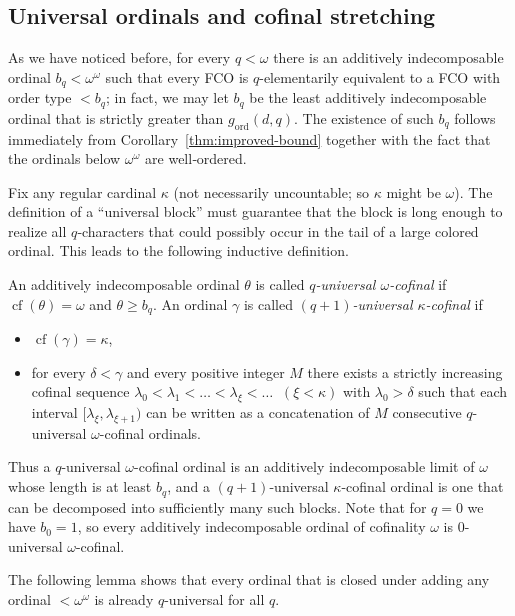 \documentclass{amsart}
\newcommand{\cf}{\operatorname{cf}}
\theoremstyle{definition}
\begin{document}
\subsection{Universal ordinals and cofinal stretching}

As we have noticed before, for every $q<\omega$ there is an additively indecomposable ordinal $b_q<\omega^\omega$ such that every FCO is $q$-elementarily equivalent to a FCO with order type $<b_q$; in fact, we may let $b_q$ be the least additively indecomposable ordinal that is strictly greater than $g_{\mathrm{ord}}(d,q)$.  The existence of such $b_q$ follows immediately from Corollary~\ref{thm:improved-bound} together with the fact that the ordinals below $\omega^\omega$ are well‑ordered.

Fix any regular cardinal $\kappa$ (not necessarily uncountable; so $\kappa$ might be $\omega$).  The definition of a ``universal block'' must guarantee that the block is long enough to realize all $q$‑characters that could possibly occur in the tail of a large colored ordinal.  This leads to the following inductive definition.

An additively indecomposable ordinal $\theta$ is called \emph{$q$-universal $\omega$-cofinal} if $\cf(\theta)=\omega$ and $\theta\geq b_q$. An ordinal $\gamma$ is called \emph{$(q+1)$-universal $\kappa$-cofinal} if
\begin{itemize}
    \item $\cf(\gamma)=\kappa$,
    \item for every $\delta<\gamma$ and every positive integer $M$ there exists a strictly increasing cofinal sequence $\lambda_0<\lambda_1<\dots<\lambda_\xi<\dots\;\;(\xi<\kappa)$ with $\lambda_0>\delta$ such that each interval $[\lambda_\xi,\lambda_{\xi+1})$ can be written as a concatenation of $M$ consecutive $q$-universal $\omega$-cofinal ordinals.
\end{itemize}

Thus a $q$-universal $\omega$-cofinal ordinal is an additively indecomposable limit of $\omega$ whose length is at least $b_q$, and a $(q+1)$-universal $\kappa$-cofinal ordinal is one that can be decomposed into sufficiently many such blocks. Note that for $q=0$ we have $b_0=1$, so every additively indecomposable ordinal of cofinality $\omega$ is $0$-universal $\omega$-cofinal.

The following lemma shows that every ordinal that is closed under adding any ordinal $<\omega^\omega$ is already $q$-universal for all $q$.
\end{document}
